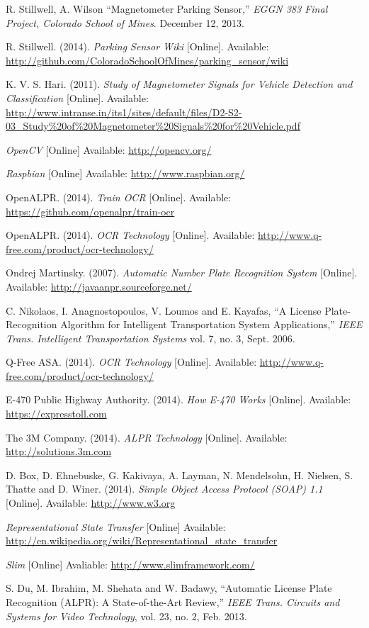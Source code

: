\documentclass[11pt, oneside, fullpage, doublespace]{article}
\begin{document}
\begin{thebibliography}{99}
 R. Stillwell, A. Wilson ``Magnetometer Parking Sensor,'' \emph{EGGN 383 Final Project, Colorado School of Mines}. December 12, 2013.

 R. Stillwell. (2014). \emph{Parking Sensor Wiki} [Online]. Available: \url{http://github.com/ColoradoSchoolOfMines/parking_sensor/wiki}

 K. V. S. Hari. (2011). \emph{Study of Magnetometer Signals for Vehicle Detection and Classification} [Online]. Available: \url{http://www.intranse.in/its1/sites/default/files/D2-S2-03_Study\%20of\%20Magnetometer\%20Signals\%20for\%20Vehicle.pdf}

 \emph{OpenCV} [Online] Available: \url{http://opencv.org/}

 \emph{Raspbian} [Online] Available: \url{http://www.raspbian.org/}

 OpenALPR. (2014). \emph{Train OCR} [Online]. Available: \url{https://github.com/openalpr/train-ocr}

 OpenALPR. (2014). \emph{OCR Technology} [Online]. Available: \url{http://www.q-free.com/product/ocr-technology/}

 Ondrej Martinsky. (2007). \emph{Automatic Number Plate Recognition System} [Online]. Available: \url{http://javaanpr.sourceforge.net/}

 C. Nikolaos, I. Anagnostopoulos, V. Loumos and E. Kayafas, ``A License Plate-Recognition Algorithm for Intelligent Transportation System Applications,'' \emph{IEEE Trans. Intelligent Transportation Systems} vol. 7, no. 3, Sept. 2006.

 Q-Free ASA. (2014). \emph{OCR Technology} [Online]. Available: \url{http://www.q-free.com/product/ocr-technology/}

 E-470 Public Highway Authority. (2014). \emph{How E-470 Works} [Online]. Available: \url{https://expresstoll.com}

 The 3M Company. (2014). \emph{ALPR Technology} [Online]. Available: \url{http://solutions.3m.com}

 D. Box, D. Ehnebuske, G. Kakivaya, A. Layman, N. Mendelsohn, H. Nielsen, S. Thatte and D. Winer. (2014). \emph{Simple Object Access Protocol (SOAP) 1.1} [Online]. Available: \url{http://www.w3.org}

 \emph{Representational State Transfer} [Online] Available: \url{http://en.wikipedia.org/wiki/Representational_state_transfer}

 \emph{Slim} [Online] Avaliable: \url{http://www.slimframework.com/}

 S. Du, M. Ibrahim, M. Shehata and W. Badawy, ``Automatic License Plate Recognition (ALPR): A State-of-the-Art Review,'' \emph{IEEE Trans. Circuits and Systems for Video Technology}, vol. 23, no. 2, Feb. 2013.

\end{thebibliography}
\end{document}
